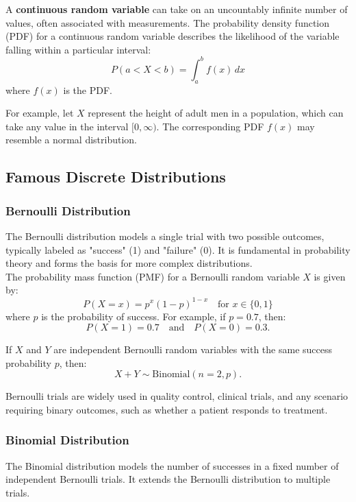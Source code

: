\begin{definition}
    A \textbf{continuous random variable} can take on an uncountably infinite number of values, often associated with measurements. The probability density function (PDF) for a continuous random variable describes the likelihood of the variable falling within a particular interval:
\[
P(a < X < b) = \int_a^b f(x) \, dx
\]
where \( f(x) \) is the PDF.
\end{definition}

For example, let \( X \) represent the height of adult men in a population, which can take any value in the interval \( [0, \infty) \). The corresponding PDF \( f(x) \) may resemble a normal distribution.

\subsection{Famous Discrete Distributions}

\subsubsection{Bernoulli Distribution}

The Bernoulli distribution models a single trial with two possible outcomes, typically labeled as "success" (1) and "failure" (0). It is fundamental in probability theory and forms the basis for more complex distributions.\\

The probability mass function (PMF) for a Bernoulli random variable \( X \) is given by:
\[
P(X = x) = p^x (1 - p)^{1 - x} \quad \text{for } x \in \{0, 1\}
\]
where \( p \) is the probability of success. For example, if \( p = 0.7 \), then:
\[
P(X = 1) = 0.7 \quad \text{and} \quad P(X = 0) = 0.3.
\]

If \( X \) and \( Y \) are independent Bernoulli random variables with the same success probability \( p \), then:
\[
X + Y \sim \text{Binomial}(n = 2, p).
\]

Bernoulli trials are widely used in quality control, clinical trials, and any scenario requiring binary outcomes, such as whether a patient responds to treatment.

\subsubsection{Binomial Distribution}

The Binomial distribution models the number of successes in a fixed number of independent Bernoulli trials. It extends the Bernoulli distribution to multiple trials.\\

